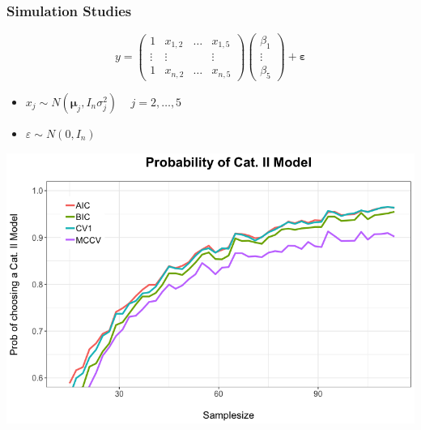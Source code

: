 \documentclass[20pt,mathserif,xcolor=dvipsnames]{beamer}
\begin{document}
\begin{frame}
\frametitle{Simulation Studies}
\begin{equation*}
y =\begin{pmatrix}
1 & x_{1,2} & \ldots & x_{1,5}\\
\vdots & \vdots& & \vdots\\
1& x_{n,2} &\ldots & x_{n,5}
\end{pmatrix}
\begin{pmatrix}
\beta_1\\
\vdots\\
\beta_5
\end{pmatrix}
+\mathbf{{\varepsilon}}
\end{equation*}
\begin{itemize}
	\item $x_{j} \sim N(\mathbf{{\mu}}_j,{I}_n\sigma^2_j)$ ~  $ j=2,\ldots,5$
	\item $\varepsilon \sim N(0,{I}_n)$
\end{itemize}
\end{frame}

\begin{frame}
\centering
\includegraphics[width=1.2\textheight]{Simulation1.png}
\end{frame}
\end{document}
